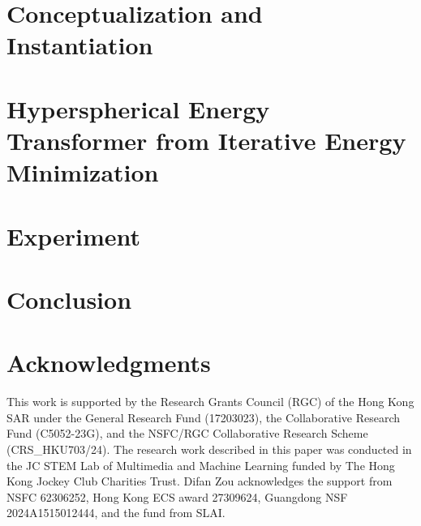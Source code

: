 
\section{Conceptualization and Instantiation}



\section{Hyperspherical Energy Transformer from Iterative Energy Minimization}



\section{Experiment}
\vspace{-0.2cm}



\section{Conclusion}


\newpage
\section*{Acknowledgments}
This work is supported by the Research Grants Council (RGC) of the Hong Kong SAR under the General Research Fund (17203023), the Collaborative Research Fund (C5052-23G), and the NSFC/RGC Collaborative Research Scheme (CRS\_HKU703/24). The research work described in this paper was conducted in the JC STEM Lab of Multimedia and Machine Learning funded by The Hong Kong Jockey Club Charities Trust. Difan Zou acknowledges the support from NSFC 62306252, Hong Kong ECS award 27309624, Guangdong
NSF 2024A1515012444, and the fund from SLAI.

